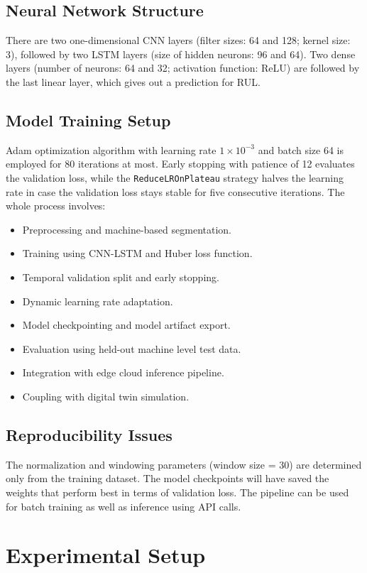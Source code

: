 \documentclass[conference]{IEEEtran}
\begin{document}
\subsection{Neural Network Structure}
There are two one-dimensional CNN layers (filter sizes: 64 and 128; kernel size: 3), followed by two LSTM layers (size of hidden neurons: 96 and 64). Two dense layers (number of neurons: 64 and 32; activation function: ReLU) are followed by the last linear layer, which gives out a prediction for RUL.

\subsection{Model Training Setup}
Adam optimization algorithm with learning rate $1 \times 10^{-3}$ and batch size 64 is employed for 80 iterations at most. Early stopping with patience of 12 evaluates the validation loss, while the \texttt{ReduceLROnPlateau} strategy halves the learning rate in case the validation loss stays stable for five consecutive iterations. The whole process involves:
\begin{itemize}
  \item Preprocessing and machine-based segmentation.
  \item Training using CNN-LSTM and Huber loss function.
  \item Temporal validation split and early stopping.
  \item Dynamic learning rate adaptation.
  \item Model checkpointing and model artifact export.
  \item Evaluation using held-out machine level test data.
  \item Integration with edge cloud inference pipeline.
  \item Coupling with digital twin simulation.
\end{itemize}

\subsection{Reproducibility Issues}
The normalization and windowing parameters (window size = 30) are determined only from the training dataset. The model checkpoints will have saved the weights that perform best in terms of validation loss. The pipeline can be used for batch training as well as inference using API calls.

\section{Experimental Setup}
\end{document}

